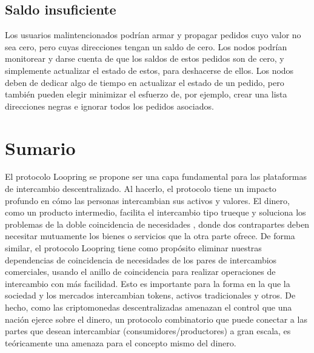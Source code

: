 \documentclass[UTF8,nofonts]{article}
\begin{document}
\begin{multicols}{2}
\subsection{Saldo insuficiente}
Los usuarios malintencionados podr\'ian armar y propagar pedidos cuyo valor no sea cero, pero cuyas direcciones tengan un saldo de cero. Los nodos podr\'ian monitorear y darse cuenta de que los saldos de estos pedidos son de cero, y simplemente actualizar el estado de estos, para deshacerse de ellos. Los nodos deben de dedicar algo de tiempo en actualizar el estado de un pedido, pero tambi\'en pueden elegir minimizar el esfuerzo de, por ejemplo, crear una lista direcciones negras e ignorar todos los pedidos asociados.

\section{Sumario}
El protocolo Loopring se propone ser una capa fundamental para las plataformas de intercambio descentralizado. Al hacerlo, el protocolo tiene un impacto profundo en c\'omo las personas intercambian sus activos y valores. El dinero, como un producto intermedio, facilita el intercambio tipo trueque y soluciona los problemas de la doble coincidencia de necesidades \cite{unenumerated2006}, donde dos contrapartes deben necesitar mutuamente los bienes o servicios que la otra parte ofrece. De forma similar, el protocolo Loopring tiene como prop\'osito eliminar nuestras dependencias de coincidencia de necesidades de los pares de intercambios comerciales, usando el anillo de coincidencia para realizar operaciones de intercambio con m\'as facilidad. Esto es importante para la forma en la que la sociedad y los mercados intercambian tokens, activos tradicionales y otros. De hecho, como las criptomonedas descentralizadas amenazan el control que una naci\'on ejerce sobre el dinero, un protocolo combinatorio que puede conectar a las partes que desean intercambiar (consumidores/productores) a gran escala, es te\'oricamente una amenaza para el concepto mismo del dinero.







\end{multicols}
\end{document}
